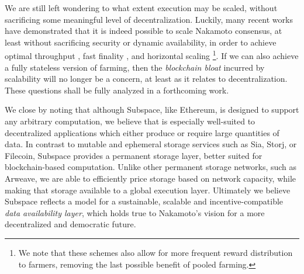 \documentclass[conference]{IEEEtran}
\begin{document}
We are still left wondering to what extent execution may be scaled, without sacrificing some meaningful level of decentralization. Luckily, many recent works have demonstrated that it is indeed possible to scale Nakamoto consensus, at least without sacrificing security or dynamic availability, in order to achieve optimal throughput \cite{bagaria2019prism}, fast finality \cite{li2020taiji}, and horizontal scaling \cite{rana2020free2shard}\footnote{We note that these schemes also allow for more frequent reward distribution to farmers, removing the last possible benefit of pooled farming.}. If we can also achieve a fully stateless version of farming, then the \textit{blockchain bloat} incurred by scalability will no longer be a concern, at least as it relates to decentralization. These questions shall be fully analyzed in a forthcoming work.

We close by noting that although Subspace, like Ethereum, is designed to support any arbitrary computation, we believe that is especially well-suited to decentralized applications which either produce or require large quantities of data. In contrast to mutable and ephemeral storage services such as Sia\cite{vorick2014sia}, Storj\cite{wilkinson2014storj}, or Filecoin\cite{benet2018filecoin}, Subspace provides a permanent storage layer, better suited for blockchain-based computation. Unlike other permanent storage networks, such as Arweave\cite{williams2019arweave}, we are able to efficiently price storage based on network capacity, while making that storage available to a global execution layer. Ultimately we believe Subspace reflects a model for a sustainable, scalable and incentive-compatible \textit{data availability layer}, which holds true to Nakamoto’s vision for a more decentralized and democratic future.

\end{document}
